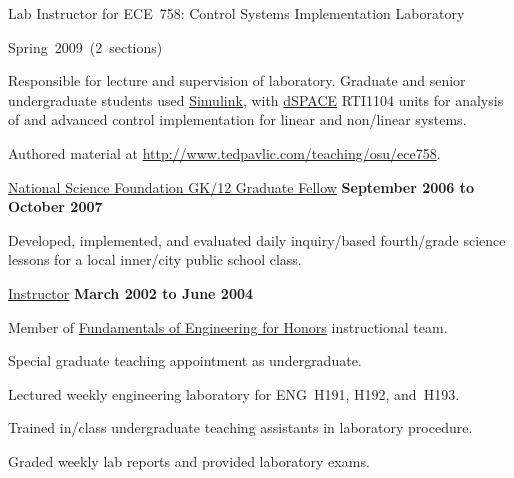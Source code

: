 \documentclass[10pt]{article}
\renewcommand\emph[1]{#1}
\renewcommand\textit[1]{\underline{#1}}
\begin{document}
\begin{outerlist}
\begin{innerlist}
        \item Lab Instructor for ECE~758: Control Systems Implementation
            Laboratory
        \begin{innerlist}
            \item Spring~2009~(2~sections)


            \item Responsible for lecture and supervision of laboratory.
                Graduate and senior undergraduate students used
                \href{http://www.mathworks.com/products/simulink/}{Simulink},
                with \href{http://www.dspaceinc.com/}{dSPACE} RTI1104
                units for analysis of and advanced control implementation
                for linear and non\-/linear systems.

            \item Authored material at
                \url{http://www.tedpavlic.com/teaching/osu/ece758}.
        \end{innerlist}
    \end{innerlist}

\item[] \href{http://www.nsfgk12.org/}
        {\emph{National Science Foundation GK\-/12 Graduate Fellow}}
        \hfill \textbf{September 2006 to October 2007}
\begin{innerlist}
    \item[] Developed, implemented, and evaluated daily inquiry\-/based
        fourth\-/grade science lessons for a local inner\-/city public
        school class.
\end{innerlist}

\item[] \textit{Instructor}%
        \hfill \textbf{March 2002 to June 2004}
\begin{innerlist}
\item Member of \href{http://feh.eng.ohio-state.edu/}
                     {Fundamentals of Engineering for Honors}
      instructional team.
\item Special graduate teaching appointment as undergraduate.
\item Lectured weekly engineering laboratory for ENG~H191,
        H192, and~H193.
\item Trained in\-/class undergraduate teaching assistants in laboratory
        procedure.
\item Graded weekly lab reports and provided laboratory exams.
\end{innerlist}


\end{outerlist}
\end{document}
